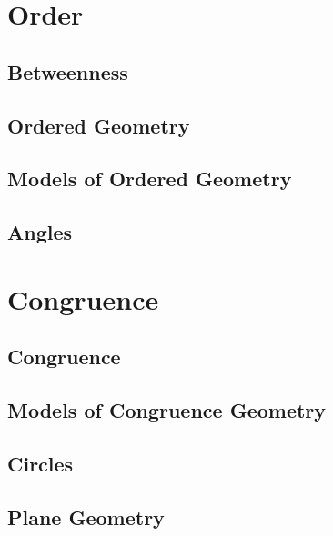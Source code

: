 \documentclass{memoir}
\begin{document}
\chapter{Order}
\newpage

  \section{Betweenness}
    
    \newpage

  \section{Ordered Geometry}
    
    \newpage

  \section{Models of Ordered Geometry}
    
    \newpage

  \section{Angles}
    
    \newpage

\chapter{Congruence}
\newpage

  \section{Congruence}
    
    \newpage

  \section{Models of Congruence Geometry}
    
    \newpage

  \section{Circles}
    
    \newpage

  \section{Plane Geometry}
    
    \newpage
\end{document}
